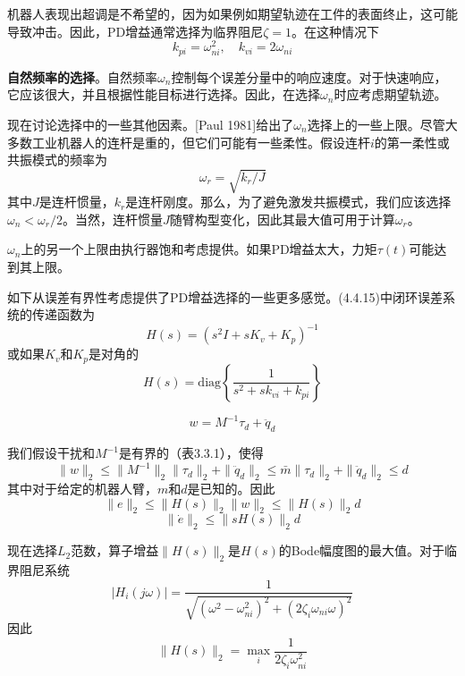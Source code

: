 \documentclass[UTF8]{ctexart}
\theoremstyle{definition}
\begin{document}
机器人表现出超调是不希望的，因为如果例如期望轨迹在工件的表面终止，这可能导致冲击。因此，PD增益通常选择为临界阻尼$\zeta = 1$。在这种情况下
\begin{equation}
    k_{pi} = \omega_{ni}^2, \quad k_{vi} = 2\omega_{ni}
\end{equation}

\textbf{自然频率的选择}。自然频率$\omega_n$控制每个误差分量中的响应速度。对于快速响应，它应该很大，并且根据性能目标进行选择。因此，在选择$\omega_n$时应考虑期望轨迹。

现在讨论选择中的一些其他因素。[Paul 1981]给出了$\omega_n$选择上的一些上限。尽管大多数工业机器人的连杆是重的，但它们可能有一些柔性。假设连杆$i$的第一柔性或共振模式的频率为
\begin{equation}
    \omega_r = \sqrt{k_r/J}
\end{equation}
其中$J$是连杆惯量，$k_r$是连杆刚度。那么，为了避免激发共振模式，我们应该选择$\omega_n < \omega_r/2$。当然，连杆惯量$J$随臂构型变化，因此其最大值可用于计算$\omega_r$。

$\omega_n$上的另一个上限由执行器饱和考虑提供。如果PD增益太大，力矩$\tau(t)$可能达到其上限。

如下从误差有界性考虑提供了PD增益选择的一些更多感觉。(4.4.15)中闭环误差系统的传递函数为
\begin{equation}
    H(s) = (s^2I + sK_v + K_p)^{-1}
\end{equation}
或如果$K_v$和$K_p$是对角的
\begin{equation}
    H(s) = \mathrm{diag}\left\{\frac{1}{s^2 + sk_{vi} + k_{pi}}\right\}
\end{equation}

\begin{equation}
    w = M^{-1}\tau_d + \ddot{q}_d
\end{equation}

我们假设干扰和$M^{-1}$是有界的（表3.3.1），使得
\begin{equation}
    \|w\|_2 \leq \|M^{-1}\|_2\|\tau_d\|_2 + \|\ddot{q}_d\|_2 \leq \bar{m}\|\tau_d\|_2 + \|\ddot{q}_d\|_2 \leq d
\end{equation}
其中对于给定的机器人臂，$m$和$d$是已知的。因此
\begin{equation}
    \|e\|_2 \leq \|H(s)\|_2\|w\|_2 \leq \|H(s)\|_2d
\end{equation}
\begin{equation}
    \|\dot{e}\|_2 \leq \|sH(s)\|_2d
\end{equation}

现在选择$L_2$范数，算子增益$\|H(s)\|_2$是$H(s)$的Bode幅度图的最大值。对于临界阻尼系统
\begin{equation}
    |H_i(j\omega)| = \frac{1}{\sqrt{(\omega^2 - \omega_{ni}^2)^2 + (2\zeta_i\omega_{ni}\omega)^2}}
\end{equation}
因此
\begin{equation}
    \|H(s)\|_2 = \max_i\frac{1}{2\zeta_i\omega_{ni}^2}
\end{equation}
\end{document}
